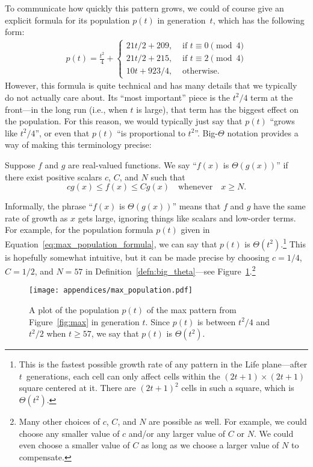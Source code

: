 To communicate how quickly this pattern grows, we could of course give an explicit formula for its population $p(t)$ in generation~$t$, which has the following form:
\begin{align}\label{eq:max_population_formula}
	p(t) = \frac{t^2}{4} + \begin{cases}
		21t/2 + 209, & \text{ if } t \equiv 0 \pmod{4} \\
		21t/2 + 215, & \text{ if } t \equiv 2 \pmod{4} \\
		10t + 923/4, & \text{ otherwise}.
	\end{cases}
\end{align}
However, this formula is quite technical and has many details that we typically do not actually care about. Its ``most important'' piece is the $t^2/4$ term at the front---in the long run (i.e., when $t$ is large), that term has the biggest effect on the population. For this reason, we would typically just say that $p(t)$ ``grows like $t^2/4$'', or even that $p(t)$ ``is proportional to $t^2$''. Big-$\Theta$ notation provides a way of making this terminology precise:

\begin{definition}\label{defn:big_theta}
	Suppose $f$ and $g$ are real-valued functions. We say ``$f(x)$ is $\Theta(g(x))$'' if there exist positive scalars $c$, $C$, and $N$ such that
	\[
		cg(x) \leq f(x) \leq Cg(x) \quad \text{whenever} \quad x \geq N.
	\]
\end{definition}

Informally, the phrase ``$f(x)$ is $\Theta(g(x))$'' means that $f$ and $g$ have the same rate of growth as $x$ gets large, ignoring things like scalars and low-order terms. For example, for the population formula $p(t)$ given in Equation~\eqref{eq:max_population_formula}, we can say that $p(t)$ is $\Theta(t^2)$.\footnote{This is the fastest possible growth rate of any pattern in the Life plane---after $t$~generations, each cell can only affect cells within the $(2t + 1) \times (2t + 1)$ square centered at it. There are $(2t+1)^2$ cells in such a square, which is $\Theta(t^2)$.} This is hopefully somewhat intuitive, but it can be made precise by choosing $c = 1/4$, $C = 1/2$, and $N = 57$ in Definition~\ref{defn:big_theta}---see Figure~\ref{fig:max_population_graph}.\footnote{Many other choices of $c$, $C$, and $N$ are possible as well. For example, we could choose any smaller value of $c$ and/or any larger value of $C$ or $N$. We could even choose a smaller value of $C$ as long as we choose a larger value of $N$ to compensate.}

\begin{figure}[!htbp]
	\centering
	\texttt{[image: appendices/max\_population.pdf]}
	\caption{A plot of the population $p(t)$ of the max pattern from Figure~\ref{fig:max} in generation $t$. Since $p(t)$ is between $t^2/4$ and $t^2/2$ when $t \geq 57$, we say that $p(t)$ is $\Theta(t^2)$.}\label{fig:max_population_graph}
\end{figure}


